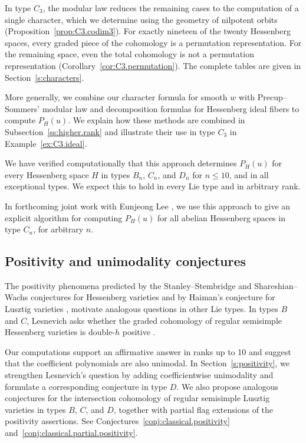 \documentclass[11pt]{amsart}
\numberwithin{equation}{section}
\theoremstyle{definition}
\begin{document}
In type $C_3$, the modular law reduces the remaining cases to the computation of a single character, which we determine using the geometry of nilpotent orbits (Proposition~\ref{prop:C3.codim3}).
For exactly nineteen of the twenty Hessenberg spaces, every graded piece of the cohomology is a permutation representation.
For the remaining space, even the total cohomology is not a permutation representation (Corollary~\ref{cor:C3.permutation}).
The complete tables are given in Section~\ref{s:characters}.


\smallskip



More generally, we combine our character formula for smooth $w$ with Precup--Sommers' modular law and decomposition formulas for Hessenberg ideal fibers \cite[Corollary~3.8, (4.7), and Propositions~5.2 and~6.5]{PS} to compute $P_H(u)$.
We explain how these methods are combined in Subsection~\ref{ss:higher.rank} and illustrate their use in type $C_3$ in Example~\ref{ex:C3.ideal}.

We have verified computationally that this approach determines $P_H(u)$ for every Hessenberg space $H$ in types $B_n$, $C_n$, and $D_n$ for $n\leq10$, and in all exceptional types.
We expect this to hold in every Lie type and in arbitrary rank.

In forthcoming joint work with Eunjeong Lee \cite{BHLL}, we use this approach to give an explicit algorithm for computing $P_H(u)$ for all abelian Hessenberg spaces in type $C_n$, for arbitrary $n$.

\subsection{Positivity and unimodality conjectures}
The positivity phenomena predicted by the Stanley--Stembridge and Shareshian--Wachs conjectures for Hessenberg varieties \cite{stanley-stembridge,SW} and by Haiman's conjecture for Lusztig varieties \cite{haiman}, motivate analogous questions in other Lie types.
In types $B$ and $C$, Lesnevich asks whether the graded cohomology of regular semisimple Hessenberg varieties is double-$h$ positive \cite[Question~A.4]{Lesnevich}.

Our computations support an affirmative answer in ranks up to 10 and suggest that the coefficient polynomials are also unimodal.
In Section~\ref{s:positivity}, we strengthen Lesnevich's question by adding coefficientwise unimodality and formulate a corresponding conjecture in type $D$. 
We also propose analogous conjectures for the intersection cohomology of regular semisimple Lusztig varieties in types $B$, $C$, and $D$, together with partial flag extensions of the positivity assertions. See Conjectures~\ref{conj:classical.positivity} and~\ref{conj:classical.partial.positivity}.
\end{document}

